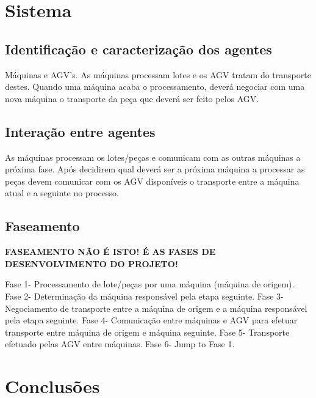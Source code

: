 \begin{titlepage}

\section{Sistema}

\subsection{Identificação e caracterização dos agentes}
Máquinas e AGV's. As máquinas processam lotes e os AGV tratam do transporte destes. Quando uma máquina acaba o processamento, deverá negociar com uma nova máquina o transporte da peça que deverá ser feito pelos AGV.

\subsection{Interação entre agentes}
As máquinas processam os lotes/peças e comunicam com as outras máquinas a próxima fase. Após decidirem qual deverá ser a próxima máquina a processar as peças devem comunicar com os AGV disponíveis o transporte entre a máquina atual e a seguinte no processo.

\subsection{Faseamento}
\textbf{FASEAMENTO NÃO É ISTO! É AS FASES DE DESENVOLVIMENTO DO PROJETO!}


Fase 1- Processamento de lote/peças por uma máquina (máquina de origem).
\newline
Fase 2- Determinação da máquina responsável pela etapa seguinte.
\newline
Fase 3- Negociamento de transporte entre a máquina de origem e a máquina responsável pela etapa seguinte.
\newline
Fase 4- Comunicação entre máquinas e AGV para efetuar transporte entre máquina de origem e máquina seguinte.
\newline
Fase 5- Transporte efetuado pelas AGV entre máquinas.
\newline
Fase 6- Jump to Fase 1.



\section{Conclusões}
\justify\normalsize





\end{titlepage}
